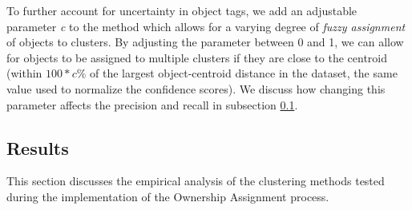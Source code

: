 To further account for uncertainty in object tags, we add an adjustable parameter \textit{c} to the method which allows for a varying degree of \textit{fuzzy assignment} of objects to clusters. 
By adjusting the parameter between 0 and 1, we can allow for objects to be assigned to multiple clusters if they are close to the centroid (within \textit{$100*c\%$} of the largest object-centroid distance in the dataset, the same value used to normalize the confidence scores). We discuss how changing this parameter affects the precision and recall in subsection \ref{subsection:own_results}.
 





\subsection{Results} \label{subsection:own_results}
This section discusses the empirical analysis of the clustering methods tested during the implementation of the Ownership Assignment process. 

